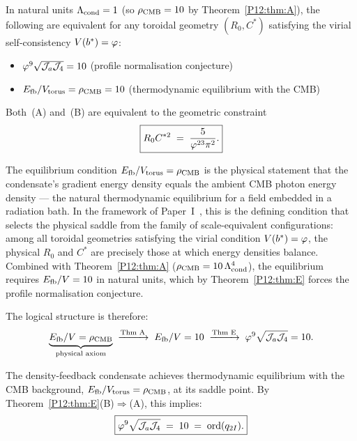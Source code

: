 \begin{theorem}
\label{P12:thm:E}
In natural units $\Lambda_{\mathrm{cond}}=1$ (so $\rho_{\mathrm{CMB}}=10$ by Theorem~\ref{P12:thm:A}),
the following are equivalent for any toroidal geometry $(R_0,C^*)$
satisfying the virial self-consistency $V(b^*)=\varphi$:
\begin{itemize}[noitemsep]
\item[\textup{(A)}] $\varphi^9\sqrt{\mathcal{J}_a\mathcal{J}_4}=10$
  \quad\textup{(profile normalisation conjecture)}
\item[\textup{(B)}] $E_{\mathrm{fb}}/V_{\mathrm{torus}}=\rho_{\mathrm{CMB}}=10$
  \quad\textup{(thermodynamic equilibrium with the CMB)}
\end{itemize}
Both~\textup{(A)} and~\textup{(B)} are equivalent to the geometric constraint
\begin{equation}
  \boxed{R_0 C^{*2} \;=\; \frac{5}{\varphi^{23}\pi^2}.}
  \label{P12:eq:RC2}
\end{equation}
\end{theorem}

\begin{remark}
\label{P12:rem:equilibrium}
The equilibrium condition $E_{\mathrm{fb}}/V_{\mathrm{torus}}=\rho_{\mathrm{CMB}}$ is the
physical statement that the condensate's gradient energy density
equals the ambient CMB photon energy density --- the natural
thermodynamic equilibrium for a field embedded in a radiation bath.
In the framework of Paper~I~\cite{Paper1}, this is the defining
condition that selects the physical saddle from the family of
scale-equivalent configurations: among all toroidal geometries satisfying
the virial condition $V(b^*)=\varphi$, the physical $R_0$ and $C^*$ are
precisely those at which energy densities balance.
Combined with Theorem~\ref{P12:thm:A} ($\rho_{\mathrm{CMB}}=10\,\Lambda_{\mathrm{cond}}^4$),
the equilibrium requires $E_{\mathrm{fb}}/V=10$ in natural units,
which by Theorem~\ref{P12:thm:E} forces the profile normalisation conjecture.

The logical structure is therefore:
\[
  \underbrace{E_{\mathrm{fb}}/V = \rho_{\mathrm{CMB}}}_{\text{physical axiom}}
  \;\xrightarrow{\text{Thm~A}}\;
  E_{\mathrm{fb}}/V = 10
  \;\xrightarrow{\text{Thm~E}}\;
  \varphi^9\sqrt{\mathcal{J}_a\mathcal{J}_4} = 10.
\]
\end{remark}

\begin{corollary}
\label{P12:cor:proof}
The density-feedback condensate achieves thermodynamic equilibrium
with the CMB background, $E_{\mathrm{fb}}/V_{\mathrm{torus}}=\rho_{\mathrm{CMB}}$, at its saddle point.
By Theorem~\ref{P12:thm:E}(B)$\Rightarrow$(A), this implies:
\begin{equation}
  \boxed{\varphi^9\sqrt{\mathcal{J}_a\mathcal{J}_4} \;=\; 10 \;=\; \operatorname{ord}(q_{2I}).}
  \label{P12:eq:conjecture_proved}
\end{equation}
\end{corollary}

